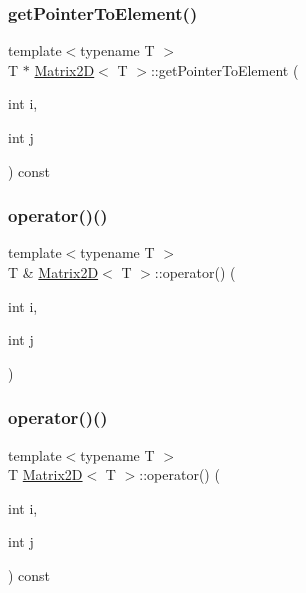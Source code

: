 \mbox{\label{classMatrix2D_ac3d6fbe385374e65ce00a34be5a7d323}} 
\subsubsection{\texorpdfstring{get\+Pointer\+To\+Element()}{getPointerToElement()}}
{\footnotesize\ttfamily template$<$typename T $>$ \\
T $\ast$ \mbox{\hyperlink{classMatrix2D}{Matrix2D}}$<$ T $>$\+::get\+Pointer\+To\+Element (\begin{DoxyParamCaption}\item[{int}]{i,  }\item[{int}]{j }\end{DoxyParamCaption}) const}

\mbox{\label{classMatrix2D_abcb61863666c4e17352c9fd2fc0a254a}} 
\subsubsection{\texorpdfstring{operator()()}{operator()()}\hspace{0.1cm}{\footnotesize\ttfamily [1/2]}}
{\footnotesize\ttfamily template$<$typename T $>$ \\
T \& \mbox{\hyperlink{classMatrix2D}{Matrix2D}}$<$ T $>$\+::operator() (\begin{DoxyParamCaption}\item[{int}]{i,  }\item[{int}]{j }\end{DoxyParamCaption})}

\mbox{\label{classMatrix2D_a1a14d98d090d0d1cbda97a8fa797f1c5}} 
\subsubsection{\texorpdfstring{operator()()}{operator()()}\hspace{0.1cm}{\footnotesize\ttfamily [2/2]}}
{\footnotesize\ttfamily template$<$typename T $>$ \\
T \mbox{\hyperlink{classMatrix2D}{Matrix2D}}$<$ T $>$\+::operator() (\begin{DoxyParamCaption}\item[{int}]{i,  }\item[{int}]{j }\end{DoxyParamCaption}) const}

